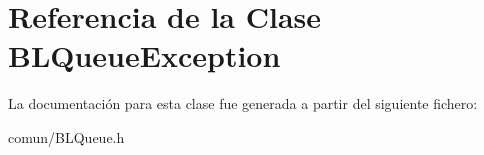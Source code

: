 \hypertarget{classBLQueueException}{\section{\-Referencia de la \-Clase \-B\-L\-Queue\-Exception}
\label{classBLQueueException}
}


\-La documentación para esta clase fue generada a partir del siguiente fichero\-:\begin{DoxyCompactItemize}
\item 
comun/\-B\-L\-Queue.\-h\end{DoxyCompactItemize}
